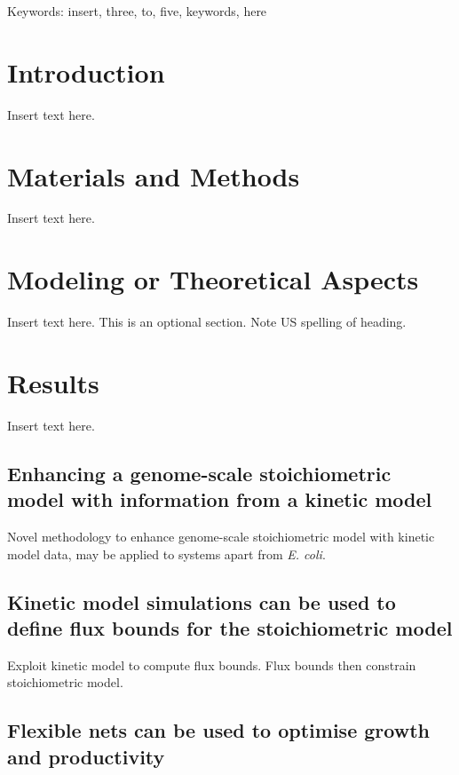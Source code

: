 \documentclass[a4paper, 12pt]{scrartcl}
\begin{document}
  Keywords: insert, three, to, five, keywords, here

  \pagebreak
    
\section*{Introduction}
\label{sec:intro}

Insert text here.

\section*{Materials and Methods}
\label{sec:methods}

Insert text here.

\section*{Modeling or Theoretical Aspects}
\label{sec:theory}

Insert text here.  This is an optional section.  Note US spelling of heading.

\section*{Results}
\label{sec:results}

Insert text here.

\subsection*{Enhancing a genome-scale stoichiometric model with information from a kinetic model}
\label{ssec:results-enhance}

  Novel methodology to enhance genome-scale stoichiometric model with kinetic model data, may be applied to systems apart from \emph{E. coli}.

\subsection*{Kinetic model simulations can be used to define flux bounds for the stoichiometric model}
\label{ssec:results-bounds}

Exploit kinetic model to compute flux bounds.  Flux bounds then constrain stoichiometric model.

\subsection*{Flexible nets can be used to optimise growth and productivity}
\label{ssec:results-fn}
\end{document}
